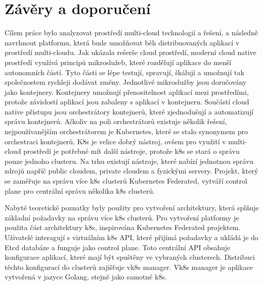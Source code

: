\chapter{Závěry a doporučení}
Cílem práce bylo analyzovat prostředí multi-cloud technologií a řešení, a následně navrhnout platformu, která bude umožňovat běh distribuovaných aplikací v prostředí multi-cloudu. Jak ukázala rešerše cloud prostředí, moderní cloud native prostředí využívá principů mikroslužeb, které rozdělují aplikace do menší autonomních částí. Tyto části se lépe testují, spravují, škálují a umožnují tak společnostem rychleji dodávat změny. Jednotlivé mikroslužby jsou doručovány jako kontejnery. Kontejnery umožnují přenositelnost aplikací mezi prostředími, protože závislostí aplikací jsou zabaleny s aplikací v kontejneru. Součástí cloud native přistupu jsou orchestrátory kontejnerů, které zjednodušují a automatizují správu kontejnerů. Ačkoliv na poli orchestrátorů existuje několik řešení, nejpoužívanějším orchestrátorem je Kubernetes, které se stalo synonymem pro orchestraci kontejnerů. K8s je velice dobrý nástroj, ovšem pro využití v multi-cloud prostředí je potřebné mít další nástroje, protože k8s se stará o správu pouze jednoho clusteru. Na trhu existují nástroje, které nabízí jednotnou správu zdrojů napříč public cloudem, private cloudem a fyzickými servery. Projekt, který se zaměřuje na správu více k8s clusterů Kubernetes Federated, vytváří control plane pro centrální správu několika k8s clusterů.\par
    Nabyté teoretické poznatky byly použity pro vytvoření architektury, která splňuje základní požadavky na správu více k8s clusterů. Pro vytvoření platformy je použita část architektury k8s, inspirována Kubernetes Federated projektem. Uživatelé interagují s virtuálním k8s API, které přijímá požadavky a ukládá je do Etcd databáze a funguje jako control plane. Toto centrální API obsahuje konfigurace aplikací, které mají být spuštěny ve vybraných clusterech. Distribuci těchto konfigurací do clusterů zajišťuje vk8s manager. Vk8s manager je aplikace vytvořená v jazyce Golang, stejně jako samotné k8s. \par
